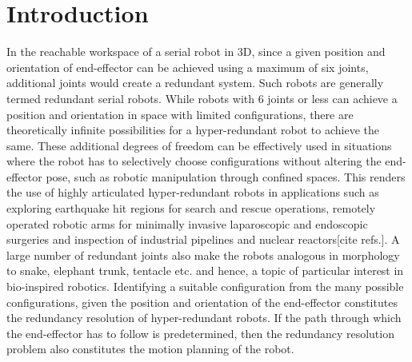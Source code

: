 \documentclass[12pt,a4]{article}
\begin{document}
\section{Introduction}
\label{sec:introduction}

In the reachable workspace of a serial robot in 3D, since a given position and orientation of end-effector can be achieved using a maximum of six joints, additional joints would create a redundant system. Such robots are generally termed redundant serial robots. While robots with 6 joints  or less can achieve a position and orientation in space with limited configurations, there are theoretically infinite possibilities for a hyper-redundant robot to achieve the same. These additional degrees of freedom can be effectively used in situations where the robot has to selectively choose configurations without altering the end-effector pose, such as robotic manipulation through confined spaces. This renders the use of highly articulated hyper-redundant robots in applications such as exploring earthquake hit regions for search and rescue operations, remotely operated robotic arms for minimally invasive laparoscopic and endoscopic surgeries and inspection of industrial pipelines and nuclear reactors[cite refs.]. A large number of redundant joints also make the robots analogous in morphology to  snake, elephant trunk, tentacle etc. and hence, a topic of particular interest in bio-inspired robotics. Identifying a suitable configuration from the many possible configurations, given the position and orientation of the end-effector constitutes the redundancy resolution of hyper-redundant robots. If the path through which the end-effector has to follow is predetermined, then the redundancy resolution problem also constitutes the motion planning of the robot.
\end{document}
